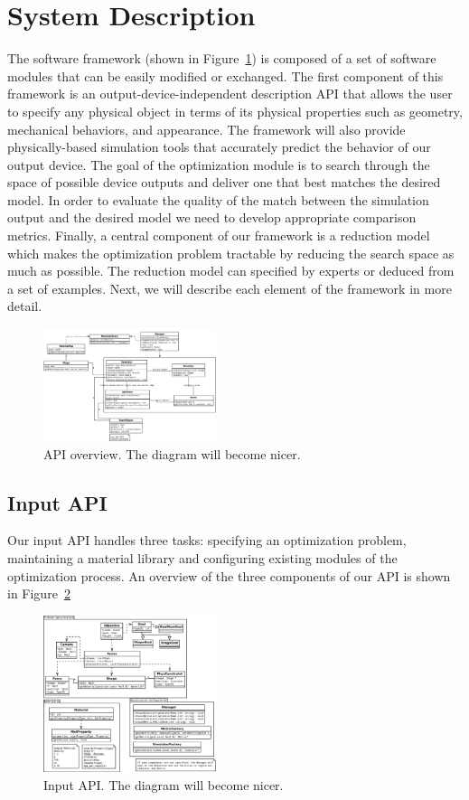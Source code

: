 \documentclass[annual]{acmsiggraph}
\begin{document}
\section{System Description}
The software framework (shown in Figure~\ref{fig:framework}) is composed of 
a set of software
modules that can be easily modified or exchanged. The first component
of this framework is an output-device-independent description API
that allows the user to specify any physical object in terms of its physical
properties such as geometry, mechanical behaviors, and appearance. 
The framework will also provide physically-based
simulation tools that accurately predict the behavior of our output device.
The goal of the optimization module is to search through
the space of possible device outputs and deliver one that best matches the
desired model. In order to evaluate the quality of the match between the
simulation output and the desired model we need to develop appropriate
comparison metrics. Finally, a central component of our framework is
a reduction model which makes the optimization problem tractable by
reducing the search space as much as possible.
The reduction model can specified by experts or deduced from a
set of examples. Next, we will describe each element of the framework in
more detail.
\begin{figure}
\includegraphics[width=0.45\textwidth]{figure/framework.pdf}
\caption{API overview. The diagram will become nicer.}
\label{fig:framework}
\end{figure}
\subsection{Input API}
Our input API handles three tasks: specifying an optimization problem,
maintaining a material library and configuring existing modules of
the optimization process.
An overview of the three components of our API is shown in Figure~\ref{fig:inputAPI}

\begin{figure}
\includegraphics[width=0.45\textwidth]{figure/inputAPI.pdf}
\caption{Input API. The diagram will become nicer.}
\label{fig:inputAPI}
\end{figure}
\end{document}

